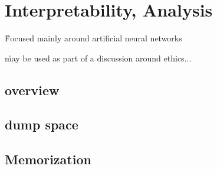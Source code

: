 \chapter{Interpretability, Analysis}


\r{Focused mainly around artificial neural networks}

\r{may be used as part of a discussion around ethics...}

\section{overview}


\section{dump space}


\section{Memorization}


